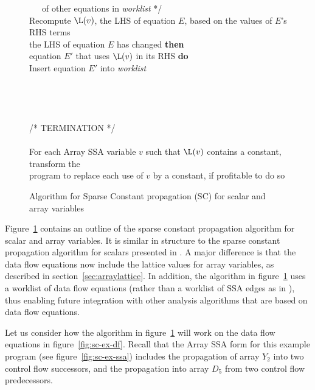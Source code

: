 \begin{figure}
\begin{center}
\begin{programa}
\Tb ~~~of other equations in {\it worklist} */ \\
\Tb Recompute $\L(v)$, the LHS of equation $E$, based on the values of $E$'s RHS terms\\
 the LHS of equation $E$ has changed {\bf then}\\
 equation $E'$ that uses $\L(v)$ in its RHS {\bf do}\\
\Td Insert equation $E'$ into {\it worklist}\\
\\
\\
 \\
\\
/* TERMINATION */\\
\\
\Ta For each Array SSA variable $v$ such that $\L(v)$ contains a constant, transform the \\ 
\Ta program to replace each use of $v$ by a constant, if profitable to do so
\end{programa}
\end{center}
\caption{Algorithm for Sparse Constant propagation (SC) for scalar and array variables}
\label{fig:sc-alg}
\end{figure}

Figure~\ref{fig:sc-alg} contains an outline of the sparse constant
propagation algorithm for scalar and array variables.  It is similar in
structure to the sparse constant propagation algorithm for scalars
presented in \cite{WeZa91}.  A major difference is that the data flow
equations now include the lattice values for array variables, as
described in section~\ref{sec:arraylattice}.
In addition, the algorithm in figure~\ref{fig:sc-alg} uses a worklist
of data flow equations (rather than a worklist of SSA edges as in \cite{WeZa91}), thus enabling future integration with other analysis algorithms that are
based on data flow equations.

Let us consider how the algorithm in figure~\ref{fig:sc-alg}
will work on the data flow equations in figure~\ref{fig:sc-ex-df}.
Recall that the Array SSA form for this example program 
(see figure~\ref{fig:sc-ex-ssa})
includes the propagation of array $Y_2$ into two control
flow successors, and the propagation into array $D_5$
from two control flow
predecessors. 


